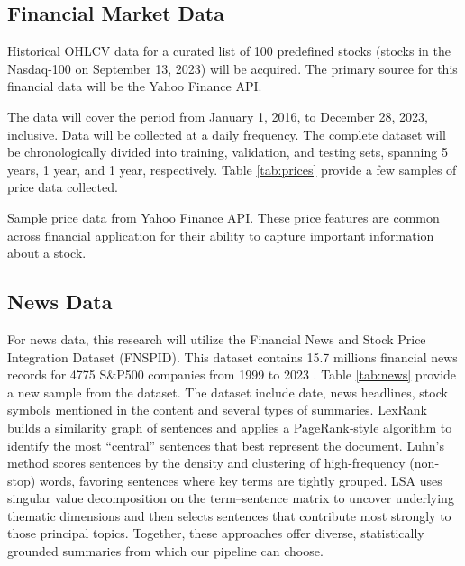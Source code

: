 \subsection{Financial Market Data}
Historical \gls{OHLCV} data for a curated list of 100 predefined stocks (stocks in the Nasdaq-100 on September 13, 2023) will be acquired. The primary source for this financial data will be the Yahoo Finance API.

The data will cover the period from January 1, 2016, to December 28, 2023, inclusive. Data will be collected at a daily frequency. The complete dataset will be chronologically divided into training, validation, and testing sets, spanning 5 years, 1 year, and 1 year, respectively. Table \ref{tab:prices} provide a few samples of price data collected.

\begin{table}
  \centering
  \small
  \caption{Sample price data from Yahoo Finance API. These price features are common across financial application for their ability to capture important information about a stock.}
  \label{tab:prices}
\end{table}

\subsection{News Data}
For news data, this research will utilize the Financial News and Stock Price Integration Dataset (FNSPID). This dataset contains 15.7 millions financial news records for 4775 S\&P500 companies from 1999 to 2023 \cite{Dong2024}. Table \ref{tab:news} provide a new sample from the dataset. The dataset include date, news headlines, stock symbols mentioned in the content and several types of summaries. LexRank builds a similarity graph of sentences and applies a PageRank‐style algorithm to identify the most “central” sentences that best represent the document. Luhn's method scores sentences by the density and clustering of high‐frequency (non‐stop) words, favoring sentences where key terms are tightly grouped. \gls{LSA} uses singular value decomposition on the term–sentence matrix to uncover underlying thematic dimensions and then selects sentences that contribute most strongly to those principal topics. Together, these approaches offer diverse, statistically grounded summaries from which our pipeline can choose.

